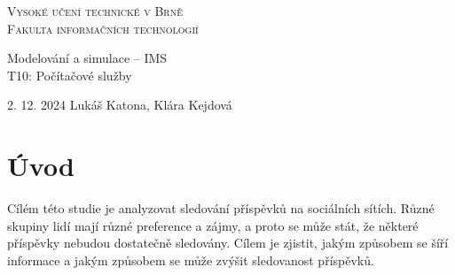 \documentclass[11pt, a4paper]{article}
\begin{document}
\begin{titlepage}
    \begin{center}
        \textsc{\Huge Vysoké učení technické v Brně\\\vspace{0.5em}\huge Fakulta informačních technologií}
        
        {\LARGE Modelování a simulace -- IMS\\\vspace{0.5em}}
        {\Huge T10: Počítačové služby}
        
    \end{center}
    {\Large 2. 12. 2024 \hfill Lukáš Katona, Klára Kejdová}
\end{titlepage}

\newpage

\section{Úvod}

Cílém této studie je analyzovat sledování příspěvků na sociálních sítích.
Různé skupiny lidí mají různé preference a zájmy, a proto se může stát,
že některé příspěvky nebudou dostatečně sledovány. Cílem je zjistit,
jakým způsobem se šíří informace a jakým způsobem se může zvýšit sledovanost příspěvků.
\end{document}
